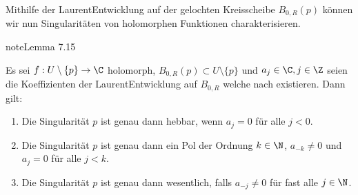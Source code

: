 \documentclass[letterpaper,10pt,german]{jupyterBook}
\begin{document}
\sphinxAtStartPar
Mithilfe der Laurent\sphinxhyphen{}Entwicklung auf der gelochten Kreisscheibe \(B_{0,R}(p)\) können wir nun Singularitäten von holomorphen Funktionen charakterisieren.
\label{complexanalysis/residuensatz:lemma-6}
\begin{sphinxadmonition}{note}{Lemma 7.15}



\sphinxAtStartPar
Es sei \(f:U\setminus\{p\}\to\C\) holomorph, \(B_{0,R}(p)\subset U\setminus\{p\}\) und \(a_j\in\C, j\in\Z\) seien die Koeffizienten der Laurent\sphinxhyphen{}Entwicklung auf \(B_{0,R}\) welche nach {\hyperref[\detokenize{complexanalysis/residuensatz:lem:laurent}]{}} existieren. Dann gilt:
\begin{enumerate}
%
\item {} 
\sphinxAtStartPar
Die Singularität \(p\) ist genau dann hebbar, wenn \(a_{j}=0\) für alle \(j<0\).

\item {} 
\sphinxAtStartPar
Die Singularität \(p\) ist genau dann ein Pol der Ordnung \(k\in\N\), \(a_{-k}\neq 0\) und \(a_j = 0\) für alle \(j<k\).

\item {} 
\sphinxAtStartPar
Die Singularität \(p\) ist genau dann wesentlich, falls \(a_{-j}\neq 0\) für fast alle \(j\in\N\).

\end{enumerate}
\end{sphinxadmonition}
\end{document}
